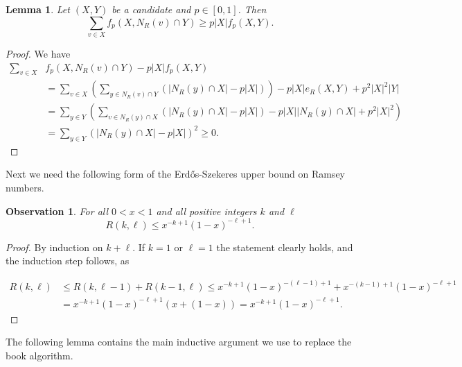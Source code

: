 \documentclass[reqno,final,12pt]{amsart}
\newtheorem{lem}[thm]{Lemma}
\newtheorem{obs}[thm]{Observation}
\newcommand{\s}[1]{\left(#1\right)}
\begin{document}
 \begin{lem}\label{l:FpAvg}
	Let $(X,Y)$ be a candidate and $p \in [0,1]$. Then \begin{equation}
	\sum_{v\in X}f_p(X,N_R(v) \cap Y) \geq p|X|f_p(X,Y).
	\end{equation}
	
\end{lem}
\begin{proof}
	We have
	\begin{align*}
	\sum_{v\in X}&f_p(X,N_R(v) \cap Y) - p|X|f_p(X,Y) \\&= \sum_{v \in X} \s{\sum_{y \in N_R(v) \cap Y}\s{ |N_R(y) \cap X| - p|X|} } -p|X|e_R(X,Y)+p^2|X|^2|Y| \\
	&= \sum_{y \in Y}\s{ 	\sum_{v \in N_R(y) \cap X} \s{|N_R(y) \cap X| -p|X|} -p|X||N_R(y) \cap X| +p^2|X|^2} \\&=\sum_{y \in Y} \s{ |N_R(y) \cap X| -p|X|}^2 \geq 0.
	\end{align*}
\end{proof}	

Next we need the following form of the Erd\H{o}s-Szekeres upper bound on Ramsey numbers.


\begin{obs}\label{o:easybound}For all $0<x<1$ and all positive integers $k$ and $\ell$
$$R(k,\ell) \leq x^{-k+1}(1-x)^{-\ell+1}.$$	
\end{obs}
\begin{proof}
	By induction on $k+\ell$. If $k=1$ or $\ell=1$ the statement clearly holds, and the induction step follows, as

	\begin{align*}R(k,\ell) &\leq R(k,\ell-1)+R(k-1,\ell) \leq x^{-k+1}(1-x)^{-(\ell-1)+1}+x^{-(k-1)+1}(1-x)^{-\ell+1} \\ &= x^{-k+1}(1-x)^{-\ell+1} (x+ (1-x)) = x^{-k+1}(1-x)^{-\ell+1} .
		\end{align*}
\end{proof}

The following lemma contains the main inductive argument we use to replace the book algorithm.
\end{document}
